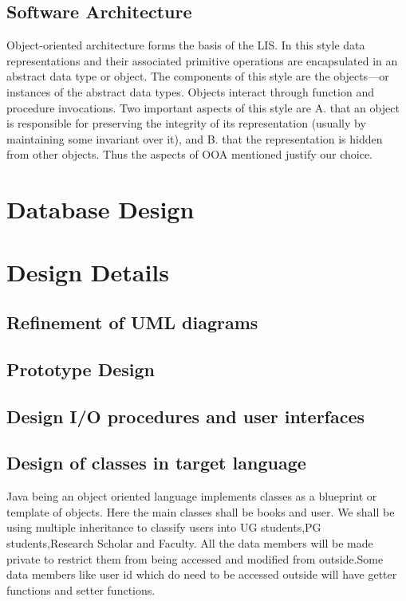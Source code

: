\documentclass{article}
\begin{document}
\subsection{Software Architecture}
Object-oriented architecture forms the basis of the LIS. In this style data representations and
their associated primitive operations are encapsulated in an abstract data type or object. The components of this style are the objects—or instances of the abstract data types. Objects interact through function and procedure invocations.
Two important aspects of this style are
A. that an object is responsible for preserving the integrity of its representation (usually by
maintaining some invariant over it), and
B. that the representation is hidden from other objects.
Thus the aspects of OOA mentioned justify our choice.

\section{Database Design}

\section{Design Details}
\subsection{Refinement of UML diagrams}
\subsection{Prototype Design}

\subsection{Design I/O procedures and user interfaces}
\subsection{Design of classes in target language}
Java being an object oriented language implements classes  as a blueprint or template of objects. Here the main classes shall be books and user.
We shall be using multiple inheritance to classify users into UG students,PG students,Research Scholar and Faculty.
All the data members will be made private to restrict them from being accessed and modified from outside.Some data members like user id which do need to be accessed outside will have getter functions and setter functions. 
\end{document}
